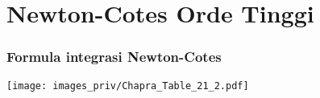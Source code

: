 \section{Newton-Cotes Orde Tinggi}

\begin{frame}
\frametitle{Formula integrasi Newton-Cotes}

{\centering
\texttt{[image: images\_priv/Chapra\_Table\_21\_2.pdf]}
\par}


\end{frame}
